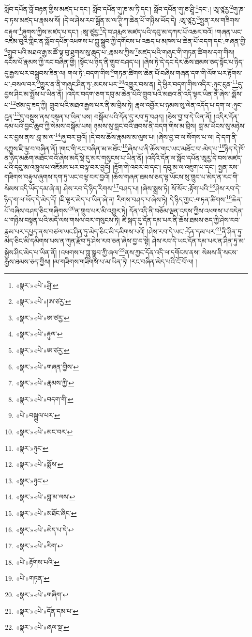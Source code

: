 སློབ་དཔོན་བློ་བརྟན་གྱིས་མཛད་པ་དང་། སློབ་དཔོན་གུ་ཎ་མ་ཏི་དང་། སློབ་དཔོན་གུ་ཎ་ཤྲཱི་\footnote{«སྣར་»«པེ་»ཤྲི་}དང་:། ཨཱ་ཙཱརྱ་\footnote{«སྣར་»«པེ་»།ཨ་ཙརྱ་}གུ་ཎ་ད་ཏས་མཛད་པ་རྣམས་སོ། །དེ་ལ་ཤེས་རབ་སྒྲོན་མ་ལ་ཊཱི་ཀ་ཆེན་པོ་གཉིས་ཡོད་དེ། :ཨཱ་ཙཱརྱ་\footnote{«སྣར་»«པེ་»ཨ་ཙརྱ་}སྤྱན་རས་གཟིགས་བརྟུལ་\footnote{«སྣར་»«པེ་»རྟུལ་}ཞུགས་ཀྱིས་མཛད་པ་དང་། :ཨཱ་ཙཱརྱ་\footnote{«སྣར་»«པེ་»ཨ་ཙརྱ་}དེ་བ་ཤརྨས་མཛད་པའི་དབུ་མ་དཀར་པོ་འཆར་བའོ། །གཞན་ཡང་འཛམ་བུའི་གླིང་ན་སློབ་དཔོན་འཕགས་པ་ཀླུ་སྒྲུབ་ཀྱི་དགོངས་པ་འཆད་པ་མཁས་པ་ཆེན་པོ་བདག་དང་:གཞན་གྱི་\footnote{«སྣར་»«པེ་»གཞན་གྱིས་}གྲུབ་པའི་མཐའ་རྒྱ་མཚོ་ལྟ་བུ་ཐུགས་སུ་ཆུད་པ་:རྣམས་ཀྱིས་\footnote{«སྣར་»«པེ་»རྣམས་ཀྱི་}མཛད་པའི་གཞུང་གི་གཏན་ཚིགས་དག་གིས། དངོས་པོ་རྣམས་ཀྱི་རང་བཞིན་གྱི། །སྟོང་པ་ཉིད་ནི་གྲུབ་བཤད་པ། །ཞེས་ཏེ་དེ་དང་དེར་ཆོས་ཐམས་ཅད་སྟོང་པ་ཉིད་དུ་རྒྱས་པར་བསྒྲུབས་ཟིན་ལ། གལ་ཏེ་:བདག་གིས་\footnote{«སྣར་»«པེ་»བདག་གི་}གཏན་ཚིགས་ཆེན་པོ་བཞིས་གཞན་དག་གི་ལོག་པར་རྟོགས་པ་:བསལ་བར་\footnote{«པེ་»བསྒྲུལ་པར་}གྱུར་ན་ནི་གཞུང་ཤིན་ཏུ་:མངས་པར་\footnote{«སྣར་»«པེ་»མང་བར་}འགྱུར་བས་ན། དེ་ཕྱིར་བདག་གིས་འདིར་:ཉུང་ངུན་\footnote{«སྣར་»ཉུང་}དུ་བྱས་ཤིང་མ་སྤྲོས་པ་ཡིན་ནོ། །འདིར་བདག་ཅག་དབུ་མ་ཆེན་པོའི་གྲུབ་པའི་མཐའ་ནི་འདི་ལྟར་ཡིན་ནོ་ཞེས་:སྨོས་པ་\footnote{«སྣར་»«པེ་»སྨོས་}ཙམ་དུ་ཟད་ཀྱི། གྲུབ་པའི་མཐའ་རྒྱས་པར་ནི་མ་བྲིས་ཏེ། རྣལ་འབྱོར་པ་ཉམས་སུ་ལེན་འདོད་པ་དག་ལ་:ཉུང་ངུན་\footnote{«སྣར་»ཉུང་}དུ་བསྡུས་ནས་བསྟན་པ་ཡིན་པས། བསྒོམ་པའི་དོན་དུ་རབ་ཏུ་བཤད། །ཅེས་བྱ་བ་དེ་ཡིན་ནོ། །འདིར་དོན་དམ་པའི་བྱང་ཆུབ་ཀྱི་སེམས་བསྒོམ་པས། ཉམས་སུ་བླང་བའི་ཐབས་ནི་བདག་གིས་མ་བྲིས། བླ་མ་ཡོངས་སུ་མཉེས་པར་བྱས་ནས་:བླ་མ་ལ་\footnote{«སྣར་»«པེ་»བླ་མ་ལས་}ཞུ་བར་བྱའོ། །དེ་བས་ཆོས་རྣམས་མ་ལུས་པ། །ཞེས་བྱ་བ་ལ་སོགས་པ་ལ། དེ་དག་ནི་དཀྱུས་ཇི་ལྟ་བ་བཞིན་ནོ། །གང་གི་རང་བཞིན་མ་མཐོང་\footnote{«སྣར་»«པེ་»མཐོང་ཞིང་}ཞེས་པ་ནི་ཆོས་གང་ཡང་མཐོང་བ་:མེད་པ་\footnote{«སྣར་»«པེ་»མེད་པ་དེ་}ཉིད་དེ་ཁོ་ན་ཉིད་མཆོག་མཐོང་བའོ་ཞེས་མདོ་སྡེ་དུ་མར་གསུངས་པ་ཡིན་ནོ། །འདིའི་དོན་ལ་སློབ་དཔོན་ཨཱརྱ་དེ་བས་མཛད་པའི་དབུ་མ་འཁྲུལ་པ་འཇོམས་པར་བལྟ་བར་བྱའོ། །རྟོག་གེ་འབར་བ་དང་། དབུ་མ་ལ་འཇུག་པ་དང་། སྤྱན་རས་གཟིགས་བརྟུལ་ཞུགས་དག་ཏུ་ཡང་བལྟ་བར་བྱའོ། །ཆོས་གཞན་ཐམས་ཅད་ལྟ་ཡོངས་སུ་གྲུབ་པ་མེད་ན་རང་གི་སེམས་འདི་ཡོད་དམ་ཞེ་ན། ཤེས་རབ་དེ་ཉིད་རིགས་\footnote{«སྣར་»«པེ་»རིག་}བཤད་པ། །ཞེས་སྨྲས་ཏེ། སོ་སོར་:རྟོག་པའི་\footnote{«པེ་»རྟོགས་པའི་}ཤེས་རབ་དེ་ཉིད་ག་ལ་ཡོད་དེ་མེད་དོ། །ཇི་ལྟར་མེད་པ་ཡིན་ཞེ་ན། རིགས་བཤད་པ་ཞེས་ཏེ། དེ་ཉིད་ཀྱང་:གཏན་ཚིགས་\footnote{«པེ་»གཏན་}ཆེན་པོ་བཞིས་བཤད་ཅིང་གཞིགས་\footnote{«སྣར་»«པེ་»གཞིག་}ན་གྲུབ་པར་མི་འགྱུར་ཏེ། དོན་འདི་ནི་བཅོམ་ལྡན་འདས་ཀྱིས་འཕགས་པ་བདེན་པ་གཉིས་བསྟན་པའི་མདོ་ལས་གསལ་བར་གསུངས་ཏེ། ཇི་སྐད་དུ་དོན་དམ་པར་ནི་ཆོས་ཐམས་ཅད་ཀྱི་ཤེས་རབ་རྣམ་པར་དཔྱད་ནས་བཙལ་ཡང་ཤིན་ཏུ་མེད་ཅིང་མི་དམིགས་པའོ། །ཤེས་རབ་དེ་ཡང་:དོན་དམ་པར་\footnote{«སྣར་»«པེ་»དོན་དམ་པ་}ནི་ཤིན་ཏུ་མེད་ཅིང་མི་དམིགས་པས་ན་ཀུན་རྫོབ་ཏུ་ཤེས་རབ་ཅན་ཞེས་བྱ་བ་སྟེ། ཤེས་རབ་དེ་ཡང་དོན་དམ་པར་ན་ཤིན་ཏུ་མ་སྐྱེས་ཤིང་མེད་པ་ཡིན་ནོ། །འཕགས་པ་ཀླུ་སྒྲུབ་ཀྱི་ཞལ་\footnote{«སྣར་»«པེ་»ཞལ་སྔ་}ནས་ཀྱང་དོན་འདི་ལ་དགོངས་ནས། སེམས་ནི་སངས་རྒྱས་ཐམས་ཅད་ཀྱིས། །མ་གཟིགས་གཟིགས་པ་མ་ཡིན་ཏེ། །རང་བཞིན་མེད་པའི་ངོ་བོ་ལ། །
